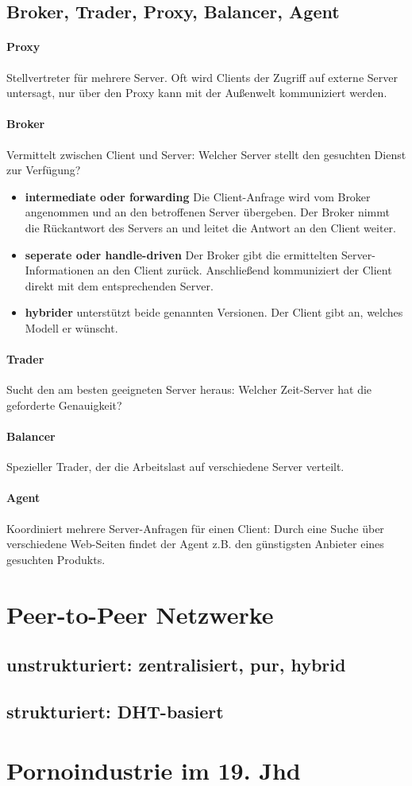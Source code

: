 \documentclass[a4paper]{article}
\begin{document}
	\subsection{Broker, Trader, Proxy, Balancer, Agent}
		\paragraph{Proxy}Stellvertreter für mehrere Server. Oft wird Clients der Zugriff auf externe Server untersagt, nur über den Proxy kann mit der Außenwelt kommuniziert werden.
		\paragraph{Broker} Vermittelt zwischen Client und Server: Welcher Server stellt den gesuchten Dienst zur Verfügung?
			\begin{itemize}
				\item \textbf{intermediate oder forwarding} Die Client-Anfrage wird vom Broker angenommen und an den betroffenen Server übergeben. Der Broker nimmt die Rückantwort des Servers an und leitet die Antwort an den Client weiter.
				\item \textbf{seperate oder handle-driven} Der Broker gibt die ermittelten Server-Informationen an den Client zurück. Anschließend kommuniziert der Client direkt mit dem entsprechenden Server.
				\item \textbf{hybrider} unterstützt beide genannten Versionen. Der Client gibt an, welches Modell er wünscht.
			\end{itemize}
		\paragraph{Trader} Sucht den am besten geeigneten Server heraus: Welcher Zeit-Server hat die geforderte Genauigkeit?
		\paragraph{Balancer}Spezieller Trader, der die Arbeitslast auf verschiedene Server verteilt.
		\paragraph{Agent}Koordiniert mehrere Server-Anfragen für einen Client: Durch eine Suche über verschiedene Web-Seiten findet der Agent z.B. den günstigsten Anbieter eines gesuchten Produkts.
\pagebreak
\section{Peer-to-Peer Netzwerke}
	\subsection{unstrukturiert: zentralisiert, pur, hybrid}
	\subsection{strukturiert: DHT-basiert}
	
\section{Pornoindustrie im 19. Jhd}
	
	
\end{document}
